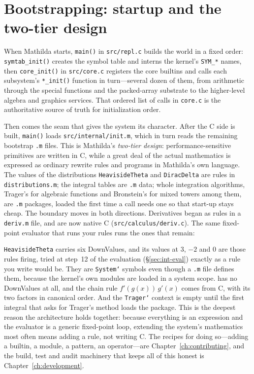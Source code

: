 \section{Bootstrapping: startup and the two-tier design}
\label{sec:int-boot}

When Mathilda starts, \texttt{main()} in \texttt{src/repl.c} builds the world in a
fixed order: \texttt{symtab\_init()} creates the symbol table and interns the kernel's
\texttt{SYM\_*} names, then \texttt{core\_init()} in \texttt{src/core.c} registers the
core builtins and calls each subsystem's \texttt{*\_init()} function in turn---several
dozen of them, from arithmetic through the special functions and the packed-array
substrate to the higher-level algebra and graphics services. That ordered list of calls
in \texttt{core.c} is the authoritative source of truth for initialization order.

Then comes the seam that gives the system its character. After the C side is built,
\texttt{main()} loads \texttt{src/internal/init.m}, which in turn reads the remaining
bootstrap \texttt{.m} files. This is Mathilda's \emph{two-tier design}:
performance-sensitive primitives are written in C, while a great deal of the actual
mathematics is expressed as ordinary rewrite rules and programs in Mathilda's own
language. The values of the distributions \texttt{HeavisideTheta} and
\texttt{DiracDelta} are rules in \texttt{distributions.m}; the integral tables are
\texttt{.m} data; whole integration algorithms, Trager's for algebraic functions and
Bronstein's for mixed towers among them, are \texttt{.m} packages, loaded the first time
a call needs one so that start-up stays cheap. The boundary moves in both directions.
Derivatives began as rules in a \texttt{deriv.m} file, and are now native C
(\texttt{src/calculus/deriv.c}). The same fixed-point evaluator that runs your rules runs
the ones that remain:


\texttt{HeavisideTheta} carries six DownValues, and its values at \(3\), \(-2\) and
\(0\) are those rules firing, tried at step~12 of the evaluation
(\S\ref{sec:int-eval}) exactly as a rule you write would be. They are \texttt{System`}
symbols even though a \texttt{.m} file defines them, because the kernel's own modules
are loaded in a system scope.  has no DownValues at all, and the chain rule
\(f'(g(x))\,g'(x)\) comes from C, with its two factors in canonical order. And the
\texttt{Trager`} context is empty until the first integral that asks for Trager's method
loads the package. This is the deepest
reason the architecture holds together: because everything is an expression and the
evaluator is a generic fixed-point loop, extending the system's mathematics most often
means adding a rule, not writing C. The recipes for doing so---adding a builtin, a
module, a pattern, an operator---are Chapter~\ref{ch:contributing}, and the build,
test and audit machinery that keeps all of this honest is
Chapter~\ref{ch:development}.
